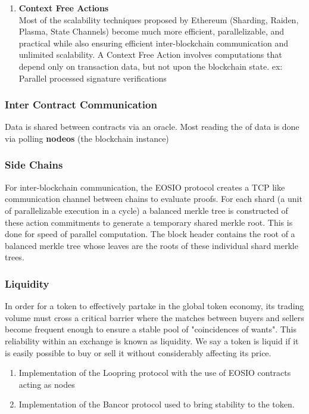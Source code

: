 \documentclass[]{article}
\begin{document}
\begin{enumerate}
	\item \textbf{Context Free Actions} \\
	Most of the scalability techniques proposed by Ethereum (Sharding, Raiden, Plasma, State Channels) become much more efficient, parallelizable, and practical while also ensuring efficient inter-blockchain communication and unlimited scalability.
	A Context Free Action involves computations that depend only on transaction data, but not upon the blockchain state.
	ex: Parallel processed signature verifications\\

	
		
\end{enumerate}
	 
	\subsubsection{Inter Contract Communication}
	Data is shared between contracts via an oracle. 
	Most reading the of data is done via polling \textbf{nodeos} (the blockchain instance)	
	
	\subsubsection{Side Chains}
	For inter-blockchain communication, the EOSIO protocol creates a TCP like communication channel between chains to evaluate proofs.
	For each shard (a unit of parallelizable execution in a cycle) a balanced merkle tree is constructed of these action commitments to generate a temporary shared merkle root. 
	This is done for speed of parallel computation. The block header contains the root of a balanced merkle tree whose leaves are the roots of these individual shard merkle trees. 

	
	\subsubsection{Liquidity}
	In order for a token to effectively partake in the global token
	economy, its trading volume must cross a critical barrier where
	the matches between buyers and sellers become frequent enough to ensure a stable pool of "coincidences of wants". 
	This reliability within an exchange is known as liquidity. We say a token is liquid if it is easily possible to buy or sell it without considerably affecting its price.
	
	\begin{enumerate} 
		\item Implementation of the Loopring protocol with the use of EOSIO 
		contracts acting as nodes
		\item Implementation of the Bancor protocol
		used to bring stability to the token.
	
	
		\end{enumerate}
	
\end{document}
